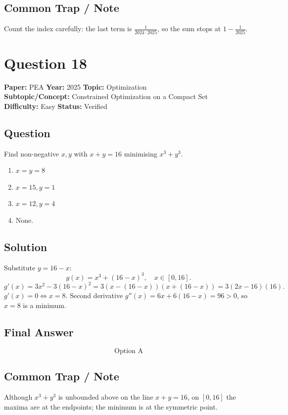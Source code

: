 \documentclass[11pt]{article}
\begin{document}
\subsection*{Common Trap / Note}
Count the index carefully: the last term is $\frac{1}{2024\cdot 2025}$, so the sum stops at $1 - \frac{1}{2025}$.

\section*{Question 18}
\textbf{Paper:} PEA \quad \textbf{Year:} 2025 \quad \textbf{Topic:} Optimization \\
\textbf{Subtopic/Concept:} Constrained Optimization on a Compact Set \\
\textbf{Difficulty:} Easy \quad \textbf{Status:} Verified

\subsection*{Question}
Find non-negative $x,y$ with $x + y = 16$ minimising $x^3 + y^3$.
\begin{enumerate}[label=(\Alph*)]
\item $x=y=8$ \item $x=15,y=1$ \item $x=12,y=4$ \item None.
\end{enumerate}

\subsection*{Solution}
Substitute $y = 16 - x$:
\[
g(x) = x^3 + (16-x)^3, \quad x \in [0,16].
\]
\[
g'(x) = 3 x^2 - 3(16-x)^2 = 3(x - (16-x))(x + (16-x)) = 3(2x-16)(16).
\]
$g'(x) = 0 \iff x = 8$. Second derivative $g''(x) = 6x + 6(16-x) = 96 > 0$, so $x=8$ is a minimum.

\subsection*{Final Answer}
\[
\boxed{\text{Option A}}
\]

\subsection*{Common Trap / Note}
Although $x^3+y^3$ is unbounded above on the line $x+y=16$, on $[0,16]$ the maxima are at the endpoints; the minimum is at the symmetric point.
\end{document}
